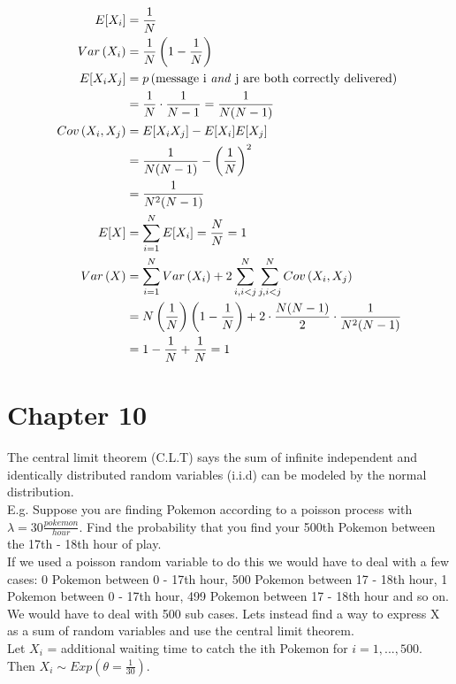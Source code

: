 \documentclass[12pt, letterpaper]{article}
\begin{document}
\begin{align*}
E[X_i] &= \frac{1}{N}\\
Var\left(X_i\right) &= \frac{1}{N}\left(1 - \frac{1}{N}\right)\\
E[X_i X_j] &= p\left(\text{message i \emph{and} j are both correctly delivered}\right)\\
&= \frac{1}{N} \cdot \frac{1}{N - 1} = \frac{1}{N(N - 1)}\\
Cov\left(X_i, X_j\right) &= E[X_i X_j] - E[X_i]E[X_j]\\
&= \frac{1}{N(N - 1)} - \left(\frac{1}{N}\right)^2\\
&= \frac{1}{N^2(N - 1)}\\
E[X] &= \sum_{i = 1}^{N} E[X_i] = \frac{N}{N} = 1\\
Var\left(X\right) &= \sum_{i = 1}^{N} Var\left(X_i\right) + 2 \sum_{i, i < j}^{N} \sum_{j, i < j}^{N} Cov\left(X_i, X_j\right)\\
&= N \left(\frac{1}{N}\right)\left(1 - \frac{1}{N}\right) + 2 \cdot \frac{N(N - 1)}{2} \cdot \frac{1}{N^2 (N - 1)}\\
&= 1 - \frac{1}{N} + \frac{1}{N} = 1
\end{align*}

\newpage

\section{Chapter 10}
The central limit theorem (C.L.T) says the sum of infinite independent and identically distributed random variables (i.i.d) can be modeled by the normal distribution.\\

E.g. Suppose you are finding Pokemon according to a poisson process with $\lambda = 30 \frac{pokemon}{hour}$. Find the probability that you find your 500th Pokemon between the 17th - 18th hour of play.\\

If we used a poisson random variable to do this we would have to deal with a few cases: 0 Pokemon between 0 - 17th hour, 500 Pokemon between 17 - 18th hour, 1 Pokemon between 0 - 17th hour, 499 Pokemon between 17 - 18th hour and so on. We would have to deal with 500 sub cases. Lets instead find a way to express X as a sum of random variables and use the central limit theorem.\\

Let $X_i$ = additional waiting time to catch the ith Pokemon for $i = 1, ..., 500$. Then $X_i \sim Exp(\theta = \frac{1}{30})$.\\
\end{document}
